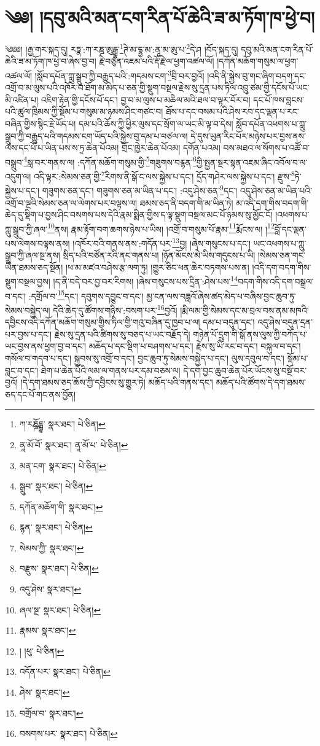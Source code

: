 \setcounter{footnote}{0} 
\chapter{༄༅། །དབུ་མའི་མན་ངག་རིན་པོ་ཆེའི་ཟ་མ་ཏོག་ཁ་ཕྱེ་བ།}༄༅༅། །རྒྱ་གར་སྐད་དུ། རཏྣ་:ཀ་རཎྜ་ཨུངྒྷ་\footnote{ཀ་རཎྜོངྒྷ་  སྣར་ཐང་།  པེ་ཅིན། }ཊེ་མ་དྷྱ་མ་:ནཱ་མ་ཨུ་པ་\footnote{ནཱ་མོ་བོ་  སྣར་ཐང་། ནཱ་མོ་པ་  པེ་ཅིན། }དེ་ཤ །བོད་སྐད་དུ། དབུ་མའི་མན་ངག་རིན་པོ་ཆེའི་ཟ་མ་ཏོག་ཁ་ཕྱེ་བ་ཞེས་བྱ་བ། རྗེ་བཙུན་འཇམ་པའི་རྡོ་རྗེ་ལ་ཕྱག་འཚལ་ལོ། །དཀོན་མཆོག་གསུམ་ལ་ཕྱག་འཚལ་ལོ། །སློབ་དཔོན་ཀླུ་སྒྲུབ་ཀྱི་བརྒྱུད་པའི་:གདམས་ངག་\footnote{མན་ངག་  སྣར་ཐང་།  པེ་ཅིན། }བྲི་བར་བྱའོ། །འདི་ནི་སྐྱེས་བུ་གང་ཞིག་བདག་དང་འགྲོ་བ་མ་ལུས་པའི་འཁོར་བ་ཐོག་མ་མེད་པ་ཅན་གྱི་སྡུག་བསྔལ་རྗེས་སུ་དྲན་པས་ཏིལ་འབྲུ་ཙམ་གྱི་དངོས་པོ་ཡང་མི་འཛིན་པ། འཇིག་རྟེན་གྱི་དངོས་པོ་དང་། བྱ་བ་མ་ལུས་པ་མཆིལ་མའི་ཐལ་བ་ལྟར་བོར་བ། དང་པོ་ཁས་བླངས་པའི་ཚུལ་ཁྲིམས་ཀྱི་སྡོམ་པ་གསུམ་མ་ཉམས་ཤིང་གཙང་བ། ཐོས་པ་དང་བསམ་པའི་ཤེས་རབ་དང་ལྡན་པ་རང་བཞིན་གྱིས་སྙིང་རྗེ་ཡོད་པ། དམ་པའི་ཆོས་ཀྱི་ཕྱིར་ལུས་དང་སྲོག་ལ་ཡང་མི་ལྟ་བ་དེས། སློབ་དཔོན་འཕགས་པ་ཀླུ་སྒྲུབ་ཀྱི་བརྒྱུད་པའི་གདམས་ངག་ཡོད་པའི་སྐྱེས་བུ་དམ་པ་བཙལ་ལ། དེ་དུས་ཡུན་རིང་པོར་མཉེས་པར་བྱས་ནས་ལས་དང་པོ་པ་ཡིན་པས་ས་ཏྲ་ཆེན་པོའམ། གྲོང་ཁྱེར་ཆེན་པོའམ། དགོན་པའམ། བས་མཐའ་ལ་སོགས་པ་འཚོ་བ་བསྒྲུབ་\footnote{སྒྲུབ་  སྣར་ཐང་།  པེ་ཅིན། }སླ་བར་གནས་ལ། :དཀོན་མཆོག་གསུམ་གྱི་\footnote{དཀོན་མཆོག་གི་  སྣར་ཐང་། }གཟུགས་བརྙན་\footnote{རྙན་  སྣར་ཐང་།  པེ་ཅིན། }གྱི་སྤྱན་སྔར་སྟན་འཇམ་ཞིང་འབོལ་བ་ལ་འདུག་ལ། འདི་ལྟར་:སེམས་ཅན་གྱི་\footnote{སེམས་ཀྱི་  སྣར་ཐང་། }རིགས་ནི་སྒོ་ང་ལས་སྐྱེས་པ་དང་། དྲོད་གཤེར་ལས་སྐྱེས་པ་དང་། རྫུས་\footnote{བརྫུས་  སྣར་ཐང་།  པེ་ཅིན། }ཏེ་སྐྱེས་པ་དང་། གཟུགས་ཅན་དང་། གཟུགས་ཅན་མ་ཡིན་པ་དང་། :འདུ་ཤེས་ཅན་\footnote{འདུ་ཤེས་  སྣར་ཐང་། }དང་། འདུ་ཤེས་ཅན་མ་ཡིན་པའི་འགྲོ་བ་ལྔའི་སེམས་ཅན་ལ་ལེགས་པར་བལྟས་ལ། ཐམས་ཅད་ནི་བདག་གི་མ་ཡིན་ཏེ། མ་འདི་དག་གིས་བདག་གི་ཆེད་དུ་སྡིག་པ་བྱས་ཤིང་བསགས་པས་དེའི་རྣམ་སྨིན་གྱིས་ད་ལྟ་སྡུག་བསྔལ་མང་པོ་ཉམས་སུ་མྱོང་ངོ། །འཕགས་པ་ཀླུ་སྒྲུབ་ཀྱི་ཞལ་\footnote{ཞལ་སྔ་  སྣར་ཐང་།  པེ་ཅིན། }ནས། རྣམ་རྟོག་བག་ཆགས་ཉེས་པ་ཡིས། །འགྲོ་བ་གསུམ་པོ་རྣམ་\footnote{རྣམས་  སྣར་ཐང་། }རྨོངས་ལ། །\footnote{། །ཕུ་  པེ་ཅིན། }བློ་དང་ལྡན་པས་ལེགས་བལྟས་ནས། །འཁོར་བའི་གནས་ནས་:གདོན་པར་\footnote{འདོན་པར་  སྣར་ཐང་།  པེ་ཅིན། }བྱ། །ཞེས་གསུངས་པ་དང་། ཡང་འཕགས་པ་ཀླུ་སྒྲུབ་ཀྱི་ཞལ་སྔ་ནས། སྲིད་པའི་བཙོན་རའི་ནང་གནས་པ། །ཉོན་མོངས་མེ་ཡིས་གདུངས་པ་ཡི། །སེམས་ཅན་གང་ཡིན་ཐམས་ཅད་སྔོན། །ཕ་མ་མཛའ་བཤེས་རྩ་ལག་ཏུ། །གྱུར་ཅིང་ཕན་ཆེར་བཏགས་པས་ན། །འདི་དག་བདག་གིས་སྡུག་བསྔལ་བྱས། །ད་ནི་བདེ་བར་བྱ་བར་རིགས། །ཞེས་གསུངས་པས་དྲིན་:ཤེས་པས་\footnote{ཤེས་  སྣར་ཐང་། }བདག་གིས་འདི་དག་བསྒྲལ་བ་དང་། :དགྲོལ་བ་\footnote{བགྲོལ་བ་  སྣར་ཐང་། }དང་། དབུགས་དབྱུང་བ་དང་། མྱ་ངན་ལས་བཟླའོ་ཞེས་ཚད་མེད་པ་བཞིས་བྱང་ཆུབ་ཏུ་སེམས་བསྐྱེད་ལ། དེའི་ཆེད་དུ་ཚོགས་གཉིས་:བསག་པར་\footnote{བསགས་པར་  སྣར་ཐང་།  པེ་ཅིན། }བྱའོ། །རྨི་ལམ་གྱི་སེམས་དང་མ་བྲལ་བས་ནམ་མཁའི་དབྱིངས་འདི་དཀོན་མཆོག་གསུམ་གྱིས་ཏིལ་གྱི་གའུ་བཞིན་དུ་ཁྱབ་པ་ལ། དམ་པ་བདུན་དང་། འདུ་ཤེས་བདུན་དྲན་པར་བྱས་པ་དང་། རྗེས་སུ་དྲན་པའི་ཚིགས་སུ་བཅད་པ་ཡང་བརྗོད་དེ། གཉེན་པོ་དྲུག་གི་སྒོ་ནས་ལུས་ཀྱི་བཀོད་པ་ཡང་བྱས་ནས་ཕྱག་བྱ་བ་དང་། མཆོད་པ་དང་སྡིག་པ་བཤགས་པ་དང་། རྗེས་སུ་ཡི་རང་བ་དང་། བསྐུལ་བ་དང་། གསོལ་བ་གདབ་པ་དང་། སྐྱབས་སུ་འགྲོ་བ་དང་། བྱང་ཆུབ་ཏུ་སེམས་བསྐྱེད་པ་དང་། ལུས་དབུལ་བ་དང་། སྡོམ་པ་བླང་བ་དང་། ཐེག་པ་ཆེན་པོའི་ལམ་ལ་གནས་པར་དམ་བཅས་ལ། དེ་དག་བྱང་ཆུབ་ཆེན་པོར་ཡོངས་སུ་བསྔོ་བར་བྱའོ། །དེ་དག་ཐམས་ཅད་ཆོས་ཀྱི་དབྱིངས་སུ་གྱུར་ཏེ། མཆོད་པའི་གནས་དང་། མཆོད་པའི་ཚོགས་དེ་དག་ཐམས་ཅད་དང་པོ་གང་ནས་བྱོན། 